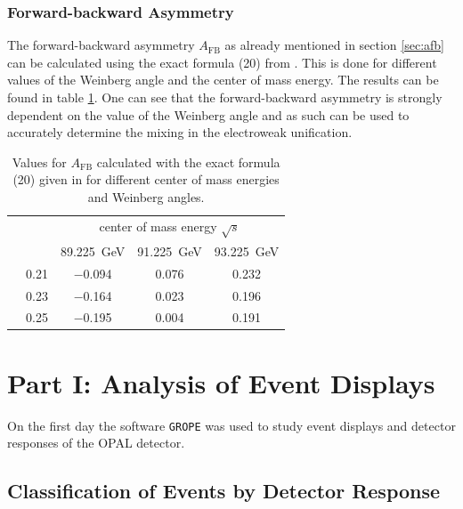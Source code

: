 \documentclass[11pt, a4paper]{article}
\numberwithin{equation}{section}
\begin{document}
\subsubsection{Forward-backward Asymmetry}

The forward-backward asymmetry $A_\mathrm{FB}$ as already mentioned in section \ref{sec:afb} can be calculated using the exact formula (20) from \cite{instructions}.
This is done for different values of the Weinberg angle and the center of mass energy.
The results can be found in table \ref{tab:afb_theory}.
One can see that the forward-backward asymmetry is strongly dependent on the value of the Weinberg angle and as such can be used to accurately determine the mixing in the electroweak unification.
\begin{table}[H]
	\centering
	\begin{tabular}{cl|ccc}
	& 			& \multicolumn{3}{c}{center of mass energy $\sqrt{s}$} 		\\
	&			& \SI{89.225}{GeV} 	& \SI{91.225}{GeV} 	& \SI{93.225}{GeV} 	\\\hline
	\multirow{3}{*}{\rotatebox{90}{$\sin^2\theta_\mathrm{W}$}}
	& \num{0.21} 	& \num{-0.094} 		& \num{0.076}		& \num{0.232}		\\
	& \num{0.23} 	& \num{-0.164}		& \num{0.023}		& \num{0.196}		\\
	& \num{0.25}	& \num{-0.195}		& \num{0.004}		& \num{0.191} 		\\	
	\end{tabular}
	\caption{Values for $A_\mathrm{FB}$ calculated with the exact formula (20) given in \cite{instructions} for different center of mass energies and Weinberg angles.}
	\label{tab:afb_theory}
\end{table}


\clearpage
\section{Part I: Analysis of Event Displays}

On the first day the software \texttt{GROPE} was used to study event displays and detector responses of the OPAL detector.

\subsection{Classification of Events by Detector Response}
\end{document}
